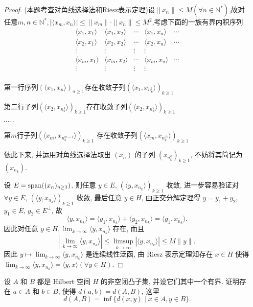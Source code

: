 \begin{proof}
(本题考查对角线选择法和Riesz表示定理)设$\|x_n\|\leq M(\forall n\in\mathbb{N^{*}})$,故对任意$m,n\in \mathbb{N^{*}},|\langle x_m,x_n\rangle|\leq\|x_m\|\cdot\|x_n\|\leq M^2$,考虑下面的一族有界内积序列
\[\begin{array}{ccccc}
\langle x_1,x_1\rangle&\langle x_1,x_2\rangle&\cdots&\langle x_1,x_n\rangle&\cdots\\
\langle x_2,x_1\rangle&\langle x_2,x_2\rangle&\cdots&\langle x_2,x_n\rangle&\cdots\\
\vdots&\vdots&\vdots&\vdots\\
\langle x_m,x_1\rangle&\langle x_m,x_2\rangle&\cdots&\langle x_m,x_n\rangle&\cdots\\
\vdots&\vdots&\vdots&\vdots\\
\end{array}\]

第一行序列$(\langle x_1,x_n\rangle)_{n\geq 1}$存在收敛子列$(\langle x_1,x_{n_k^1}\rangle)_{k\geq 1}$

第二行子列$(\langle x_2,x_{n_k^1}\rangle)_{k\geq 1}$存在收敛子列$(\langle x_2,x_{n_k^2}\rangle)_{k\geq 1}$

$\cdots\cdots$

第$m$行子列$(\langle x_m,x_{n_k^{m-1}}\rangle)_{k\geq 1}$
存在收敛子列$(\langle x_m,x_{n_k^m}\rangle)_{k\geq 1}$
 
依此下来, 并运用对角线选择法取出 $(x_n)$ 的子列 $(x_{n_k^k})_{k\geq 1}$,
不妨将其简记为 $(x_{n_k})$.

设 $E = \operatorname{span}((x_n)_{n\geq 1})$, 
则任意 $y\in E$, $(\langle y,x_{n_k}\rangle)_{k\geq 1}$ 收敛,
进一步容易验证对 $\forall y\in\overline{E}$, $(\langle y,x_{n_k}\rangle)_{k\geq 1}$ 收敛,
最后任意 $y\in H$, 由正交分解定理得 $y=y_1+y_2$, $y_1\in\overline{E}$, $y_2\in E^{\perp}$, 故
\[\langle y,x_{n_k}\rangle
  = \langle y_1,x_{n_k}\rangle+\langle y_2,x_{n_k}\rangle=\langle y_1,x_{n_k}\rangle.\]
因此对任意 $y\in H,\lim_{k\to\infty}\langle y,x_{n_k}\rangle$ 存在, 而且
\[\left|\lim_{k\to\infty}\langle y,x_{n_k}\rangle\right|\leq\limsup_{k\to\infty}|\langle y,x_{n_k}\rangle|\leq M\|y\|.\]
因此 $y\mapsto\lim_{k\to\infty}\langle y,x_{n_k}\rangle$ 是连续线性泛函, 
由 Riesz 表示定理知存在 $x\in H$ 使得 $\lim_{k\to\infty}\langle y,x_{n_k}\rangle=\langle y,x\rangle(\forall y\in H)$.
\end{proof}




\begin{exercise}
    设 $A$ 和 $B$ 都是 Hilbert 空间 $H$ 的非空闭凸子集,
    并设它们其中一个有界. 证明存在 $a\in A$ 和 $b\in B$,
    使得 $d(a,b)=d(A,B)$, 这里
    \[d(A,B)=\inf\{d(x,y)\mid x\in A, y\in B\}.\]
\end{exercise}

